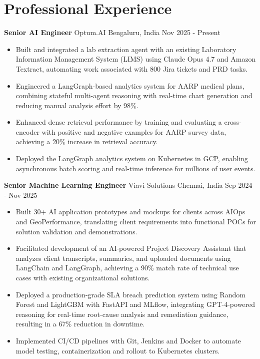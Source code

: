 \documentclass[10pt,a4paper]{article}
\newcommand{\role}[4]{\textbf{#1} \textbar{} #2 \hfill #3 \textbar{} #4\par}
\begin{document}
\section{Professional Experience}
\role{Senior AI Engineer}{Optum.AI}{Bengaluru, India}{Nov 2025 - Present}
\begin{itemize}
  \item Built and integrated a lab extraction agent with an existing Laboratory Information Management System (LIMS) using Claude Opus 4.7 and Amazon Textract, automating work associated with 800 Jira tickets and PRD tasks.
  \item Engineered a LangGraph-based analytics system for AARP medical plans, combining stateful multi-agent reasoning with real-time chart generation and reducing manual analysis effort by 98\%.
  \item Enhanced dense retrieval performance by training and evaluating a cross-encoder with positive and negative examples for AARP survey data, achieving a 20\% increase in retrieval accuracy.
  \item Deployed the LangGraph analytics system on Kubernetes in GCP, enabling asynchronous batch scoring and real-time inference for millions of user events.
\end{itemize}
\vspace{3pt}
\role{Senior Machine Learning Engineer}{Viavi Solutions}{Chennai, India}{Sep 2024 - Nov 2025}
\begin{itemize}
  \item Built 30+ AI application prototypes and mockups for clients across AIOps and GeoPerformance, translating client requirements into functional POCs for solution validation and demonstrations.
  \item Facilitated development of an AI-powered Project Discovery Assistant that analyzes client transcripts, summaries, and uploaded documents using LangChain and LangGraph, achieving a 90\% match rate of technical use cases with existing organizational solutions.
  \item Deployed a production-grade SLA breach prediction system using Random Forest and LightGBM with FastAPI and MLflow, integrating GPT-4-powered reasoning for real-time root-cause analysis and remediation guidance, resulting in a 67\% reduction in downtime.
  \item Implemented CI/CD pipelines with Git, Jenkins and Docker to automate model testing, containerization and rollout to Kubernetes clusters.
\end{itemize}
\end{document}
